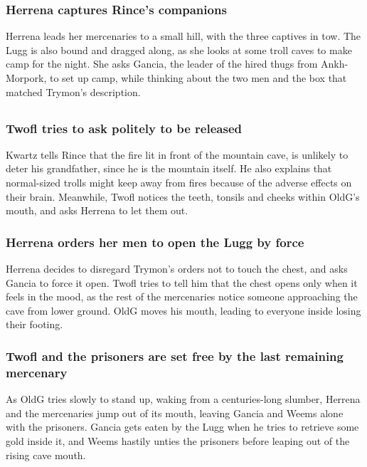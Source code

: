 \subsubsection{\Gls{Herrena} captures \Gls{Rince}'s companions}
\Gls{Herrena} leads her mercenaries to a small hill, with the three captives in tow. The \Gls{Lugg}
is also bound and dragged along, as she looks at some troll caves to make camp for the night. She
asks \Gls{Gancia}, the leader of the hired thugs from Ankh-Morpork, to set up camp, while thinking
about the two men and the box that matched \Gls{Trymon}'s description.

\subsection{}
\subsubsection{\Gls{Twofl} tries to ask politely to be released}
\Gls{Kwartz} tells \Gls{Rince} that the fire lit in front of the mountain cave, is unlikely to
deter his grandfather, since he is the mountain itself. He also explains that normal-sized trolls
might keep away from fires because of the adverse effects on their brain. Meanwhile, \Gls{Twofl}
notices the teeth, tonsils and cheeks within \Gls{OldG}'s mouth, and asks \Gls{Herrena} to let them
out.

\subsubsection{\Gls{Herrena} orders her men to open the \Gls{Lugg} by force}
\Gls{Herrena} decides to disregard \Gls{Trymon}'s orders not to touch the chest, and asks
\Gls{Gancia} to force it open. \Gls{Twofl} tries to tell him that the chest opens only when it feels
in the mood, as the rest of the mercenaries notice someone approaching the cave from lower ground.
\Gls{OldG} moves his mouth, leading to everyone inside losing their footing.

\subsubsection{\Gls{Twofl} and the prisoners are set free by the last remaining mercenary}
As \Gls{OldG} tries slowly to stand up, waking from a centuries-long slumber,
\Gls{Herrena} and the mercenaries jump out of its mouth, leaving \Gls{Gancia} and \Gls{Weems} alone
with the prisoners. \Gls{Gancia} gets eaten by the \Gls{Lugg} when he tries to retrieve some gold
inside it, and \Gls{Weems} hastily unties the prisoners before leaping out of the rising cave mouth.

